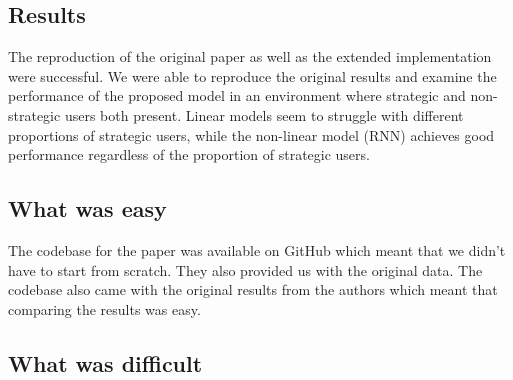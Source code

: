 \subsection*{Results}
The reproduction of the original paper as well as the extended implementation were successful. We were able to reproduce the original results and examine the performance of the proposed model in an environment where strategic and non-strategic users both present. Linear models seem to struggle with different proportions of strategic users, while the non-linear model (RNN) achieves good performance regardless of the proportion of strategic users.
\subsection*{What was easy}


The codebase for the paper was available on GitHub which meant that we didn't have to start from scratch. They also provided us with the original data. The codebase also came with the original results from the authors which meant that comparing the results was easy.



\subsection*{What was difficult}

